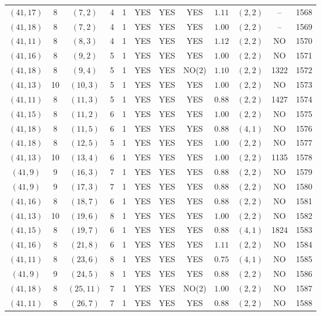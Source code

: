 \begin{longtable}{|c|c|c|c|c|c|c|c|c|c|c|c|}
$(41,17)$ & 8 & $(7,2)$ & 4 & 1 & YES & YES & YES & $1.11$ & $(2,2)$ & -- & 1568\\
$(41,18)$ & 8 & $(7,2)$ & 4 & 1 & YES & YES & YES & $1.00$ & $(2,2)$ & -- & 1569\\
$(41,11)$ & 8 & $(8,3)$ & 4 & 1 & YES & YES & YES & $1.12$ & $(2,2)$ & NO & 1570\\
$(41,16)$ & 8 & $(9,2)$ & 5 & 1 & YES & YES & YES & $1.00$ & $(2,2)$ & NO & 1571\\
$(41,18)$ & 8 & $(9,4)$ & 5 & 1 & YES & YES & NO(2) & $1.10$ & $(2,2)$ & 1322 & 1572\\
$(41,13)$ & 10 & $(10,3)$ & 5 & 1 & YES & YES & YES & $1.00$ & $(2,2)$ & NO & 1573\\
$(41,11)$ & 8 & $(11,3)$ & 5 & 1 & YES & YES & YES & $0.88$ & $(2,2)$ & 1427 & 1574\\
$(41,15)$ & 8 & $(11,2)$ & 6 & 1 & YES & YES & YES & $1.00$ & $(2,2)$ & NO & 1575\\
$(41,18)$ & 8 & $(11,5)$ & 6 & 1 & YES & YES & YES & $0.88$ & $(4,1)$ & NO & 1576\\
$(41,18)$ & 8 & $(12,5)$ & 5 & 1 & YES & YES & YES & $1.00$ & $(2,2)$ & NO & 1577\\
$(41,13)$ & 10 & $(13,4)$ & 6 & 1 & YES & YES & YES & $1.00$ & $(2,2)$ & 1135 & 1578\\
$(41,9)$ & 9 & $(16,3)$ & 7 & 1 & YES & YES & YES & $0.88$ & $(2,2)$ & NO & 1579\\
$(41,9)$ & 9 & $(17,3)$ & 7 & 1 & YES & YES & YES & $0.88$ & $(2,2)$ & NO & 1580\\
$(41,16)$ & 8 & $(18,7)$ & 6 & 1 & YES & YES & YES & $0.88$ & $(2,2)$ & NO & 1581\\
$(41,13)$ & 10 & $(19,6)$ & 8 & 1 & YES & YES & YES & $1.00$ & $(2,2)$ & NO & 1582\\
$(41,15)$ & 8 & $(19,7)$ & 6 & 1 & YES & YES & YES & $0.88$ & $(4,1)$ & 1824 & 1583\\
$(41,16)$ & 8 & $(21,8)$ & 6 & 1 & YES & YES & YES & $1.11$ & $(2,2)$ & NO & 1584\\
$(41,11)$ & 8 & $(23,6)$ & 8 & 1 & YES & YES & YES & $0.75$ & $(4,1)$ & NO & 1585\\
$(41,9)$ & 9 & $(24,5)$ & 8 & 1 & YES & YES & YES & $0.88$ & $(2,2)$ & NO & 1586\\
$(41,18)$ & 8 & $(25,11)$ & 7 & 1 & YES & YES & NO(2) & $1.00$ & $(2,2)$ & NO & 1587\\
$(41,11)$ & 8 & $(26,7)$ & 7 & 1 & YES & YES & YES & $0.88$ & $(2,2)$ & NO & 1588\\

\end{longtable}
